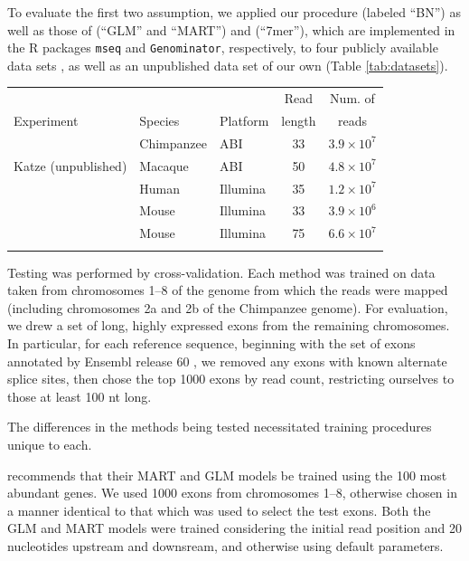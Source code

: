 \documentclass{bioinfo}
\begin{document}
To evaluate the first two assumption, we applied our procedure (labeled ``BN'')
as well as those of \citet{Li2010} (``GLM'' and ``MART'') and \citet{Hansen2010}
(``7mer''), which are implemented in the R packages \texttt{mseq} and
\texttt{Genominator}, respectively, to four publicly available data sets
\citep{Bullard2010, Mortazavi2008, Trapnell2010, Wetterbom2010}, as well as an
unpublished data set of our own (Table \ref{tab:datasets}).

\begin{table}
{
\begin{tabular}{lllcc}\toprule
 & & & Read & Num. of \\
Experiment & Species & Platform & length & reads \\\midrule
\citet{Wetterbom2010} & Chimpanzee & ABI & 33 & $3.9 \times 10^7$ \\
Katze (unpublished) & Macaque & ABI & 50  & $4.8 \times 10^7$ \\
\citet{Bullard2010} & Human & Illumina & 35 & $1.2 \times 10^7$ \\
\citet{Mortazavi2008} & Mouse & Illumina & 33 & $3.9 \times 10^6$ \\
\citet{Trapnell2010} & Mouse & Illumina & 75 & $6.6 \times 10^7$ \\\botrule
\end{tabular}
}{}
\end{table}


Testing was performed by cross-validation. Each method was trained on data taken
from chromosomes 1--8 of the genome from which the reads were mapped (including
chromosomes 2a and 2b of the Chimpanzee genome). For evaluation, we drew a set
of long, highly expressed exons from the remaining chromosomes. In particular,
for each reference sequence, beginning with the set of exons annotated by
Ensembl release 60 \cite{Hubbard2009}, we removed any exons with known alternate
splice sites, then chose the top 1000 exons by read count, restricting ourselves
to those at least 100 nt long.

The differences in the methods being tested necessitated training procedures
unique to each.

\citet{Li2010} recommends that their MART and GLM models be trained using the
100 most abundant genes. We used 1000 exons from chromosomes 1--8, otherwise
chosen in a manner identical to that which was used to select the test exons.
Both the GLM and MART models were trained considering the initial read position
and 20 nucleotides upstream and downsream, and otherwise using default
parameters.
\end{document}
